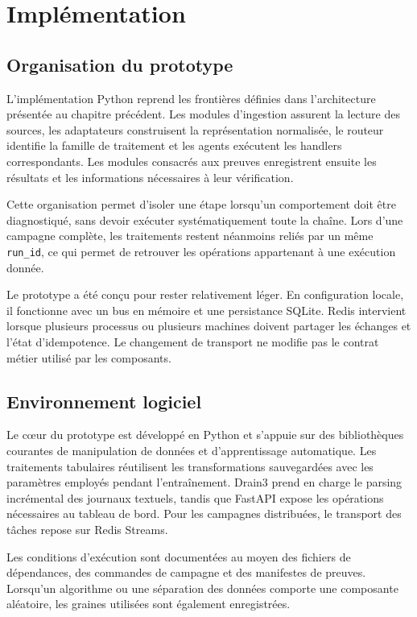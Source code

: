 \chapter{Implémentation}

\section{Organisation du prototype}

L'implémentation Python reprend les frontières définies dans l'architecture présentée au chapitre précédent. Les modules d'ingestion assurent la lecture des sources, les adaptateurs construisent la représentation normalisée, le routeur identifie la famille de traitement et les agents exécutent les handlers correspondants. Les modules consacrés aux preuves enregistrent ensuite les résultats et les informations nécessaires à leur vérification.

Cette organisation permet d'isoler une étape lorsqu'un comportement doit être diagnostiqué, sans devoir exécuter systématiquement toute la chaîne. Lors d'une campagne complète, les traitements restent néanmoins reliés par un même \texttt{run\_id}, ce qui permet de retrouver les opérations appartenant à une exécution donnée.

Le prototype a été conçu pour rester relativement léger. En configuration locale, il fonctionne avec un bus en mémoire et une persistance SQLite. Redis intervient lorsque plusieurs processus ou plusieurs machines doivent partager les échanges et l'état d'idempotence. Le changement de transport ne modifie pas le contrat métier utilisé par les composants.


\section{Environnement logiciel}

Le cœur du prototype est développé en Python et s'appuie sur des bibliothèques courantes de manipulation de données et d'apprentissage automatique. Les traitements tabulaires réutilisent les transformations sauvegardées avec les paramètres employés pendant l'entraînement. Drain3 prend en charge le parsing incrémental des journaux textuels, tandis que FastAPI expose les opérations nécessaires au tableau de bord. Pour les campagnes distribuées, le transport des tâches repose sur Redis Streams.

Les conditions d'exécution sont documentées au moyen des fichiers de dépendances, des commandes de campagne et des manifestes de preuves. Lorsqu'un algorithme ou une séparation des données comporte une composante aléatoire, les graines utilisées sont également enregistrées.

